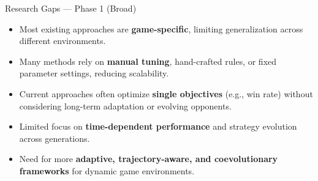 \documentclass[aspectratio=169, 11pt]{beamer}
\begin{document}
\begin{frame}{Research Gaps --- Phase 1 (Broad)}
\small
\begin{itemize}
    \item Most existing approaches are \textbf{game-specific}, limiting generalization across different environments.
    \item Many methods rely on \textbf{manual tuning}, hand-crafted rules, or fixed parameter settings, reducing scalability.
    \item Current approaches often optimize \textbf{single objectives} (e.g., win rate) without considering long-term adaptation or evolving opponents.
    \item Limited focus on \textbf{time-dependent performance} and strategy evolution across generations.
    \item Need for more \textbf{adaptive, trajectory-aware, and coevolutionary frameworks} for dynamic game environments.
\end{itemize}
\vspace{0.2cm}

\end{frame}
\end{document}
